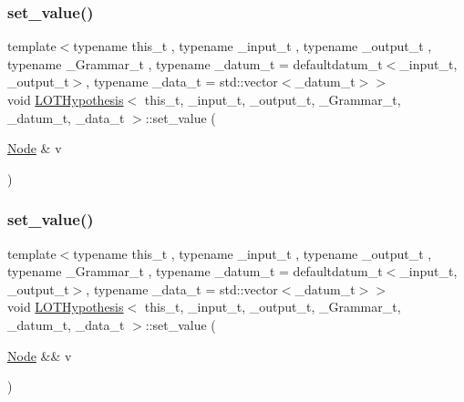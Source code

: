 \subsubsection{\texorpdfstring{set\+\_\+value()}{set\_value()}\hspace{0.1cm}{\footnotesize\ttfamily [1/2]}}
{\footnotesize\ttfamily template$<$typename this\+\_\+t , typename \+\_\+input\+\_\+t , typename \+\_\+output\+\_\+t , typename \+\_\+\+Grammar\+\_\+t , typename \+\_\+datum\+\_\+t  = defaultdatum\+\_\+t$<$\+\_\+input\+\_\+t, \+\_\+output\+\_\+t$>$, typename \+\_\+data\+\_\+t  = std\+::vector$<$\+\_\+datum\+\_\+t$>$$>$ \\
void \hyperlink{class_l_o_t_hypothesis}{L\+O\+T\+Hypothesis}$<$ this\+\_\+t, \+\_\+input\+\_\+t, \+\_\+output\+\_\+t, \+\_\+\+Grammar\+\_\+t, \+\_\+datum\+\_\+t, \+\_\+data\+\_\+t $>$\+::set\+\_\+value (\begin{DoxyParamCaption}\item[{\hyperlink{class_node}{Node} \&}]{v }\end{DoxyParamCaption})\hspace{0.3cm}{\ttfamily [inline]}}

\mbox{\label{class_l_o_t_hypothesis_a89b8752847c12768f3eb631ce939bb34}} 
\subsubsection{\texorpdfstring{set\+\_\+value()}{set\_value()}\hspace{0.1cm}{\footnotesize\ttfamily [2/2]}}
{\footnotesize\ttfamily template$<$typename this\+\_\+t , typename \+\_\+input\+\_\+t , typename \+\_\+output\+\_\+t , typename \+\_\+\+Grammar\+\_\+t , typename \+\_\+datum\+\_\+t  = defaultdatum\+\_\+t$<$\+\_\+input\+\_\+t, \+\_\+output\+\_\+t$>$, typename \+\_\+data\+\_\+t  = std\+::vector$<$\+\_\+datum\+\_\+t$>$$>$ \\
void \hyperlink{class_l_o_t_hypothesis}{L\+O\+T\+Hypothesis}$<$ this\+\_\+t, \+\_\+input\+\_\+t, \+\_\+output\+\_\+t, \+\_\+\+Grammar\+\_\+t, \+\_\+datum\+\_\+t, \+\_\+data\+\_\+t $>$\+::set\+\_\+value (\begin{DoxyParamCaption}\item[{\hyperlink{class_node}{Node} \&\&}]{v }\end{DoxyParamCaption})\hspace{0.3cm}{\ttfamily [inline]}}


